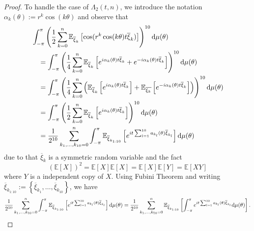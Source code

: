 \documentclass[12pt]{amsart}
\theoremstyle{plain}
\numberwithin{equation}{section}
\newcommand{\<}{\langle}
\renewcommand{\>}{\rangle}
\newcommand{\PP}[1]{\left(#1\right)}
\newcommand{\LL}[1]{\left\{#1\right\}}
\newcommand{\dd}{\textnormal{d}}
\newcommand{\E}[2][ ]{\mathbb{E}{#1}\left[#2\right]}
\renewcommand{\line}{\overline}
\begin{document}
\begin{proof}
 To handle the case of $\Lambda_2(t,n)$, we introduce the notation $\alpha_k(\theta):= r^k \cos(k\theta)$ and observe that 
 \begin{align*}
& \int_{-\pi}^{\pi} \PP{\frac{1}{2}\sum_{k=0}^n\E[_{\overline{\xi}_k}]{\cos(r^k\cos(k\theta)t\overline{\xi}_k) }}^{10} \dd \mu(\theta) \\
& \quad = \int_{-\pi}^{\pi} \PP{ \frac{1}{4} \sum_{k=0}^{n} \E[_{\overline{\xi}_k} ]{ e^{i\alpha_k(\theta)t\overline{\xi}_k}+e^{-i\alpha_k(\theta)t\overline{\xi}_k} } }^{10} \dd \mu(\theta) \\
& \quad = \int_{-\pi}^{\pi} \PP{ \frac{1}{4} \sum_{k=0}^{n} \PP{ \E[_{\overline{\xi}_k}]{ e^{i\alpha_k(\theta)t\overline{\xi}_k}} + \E[_{\overline{\xi_k}}]{e^{-i\alpha_k(\theta)t\overline{\xi}_k} } } }^{10} \dd \mu(\theta) \\
& \quad = \int_{-\pi}^{\pi} \PP{ \frac{1}{2} \sum_{k=0}^{n} \E[_{\overline{\xi}_k }]{ e^{i\alpha_k(\theta)t\overline{\xi}_k}} }^{10} \dd \mu(\theta) \\
& \quad = \frac{1}{2^{10}} \sum_{k_1,\ldots,k_{10}=0}^n \int_{-\pi}^{\pi} \E[_{\overline{\xi}_{k_{1:10}} }]{e^{it\sum_{l=1}^{10} a_{k_l}(\theta) \overline{\xi}_{k_l} }} \dd \mu(\theta)
\end{align*} 
due to that $\line{\xi}_k$ is a symmetric random variable and the fact \[ (\E{X})^2=\E{X}\E{X} = \E{X}\E{Y}=\E{XY} \] where $Y$ is a independent copy of $X$. Using Fubini Theorem and writing $\overline{\xi}_{k_{1:10}}:=\LL{\line{\xi}_{k_1},\ldots,\line{\xi}_{k_{10}}}$, we have 
\[
\frac{1}{2^{10}}  \sum_{k_1,\ldots,k_{10}=0}^n \int_{-\pi}^{\pi} \E[_{\overline{\xi}_{k_{1:10}} }]{e^{it\sum_{l=1}^{10} a_{k_l}(\theta) \overline{\xi}_{k_l} }} \dd \mu(\theta) =   \frac{1}{2^{10}} \sum_{k_1,\ldots,k_{10}=0}^n  \E[_{\overline{\xi}_{k_{1:10}} }]{\int_{-\pi}^{\pi} e^{it \sum_{l=1}^{10} a_{k_l}(\theta) \overline{\xi}_{k_l} } \dd \mu(\theta)}.
\]


\end{proof}
\end{document}
